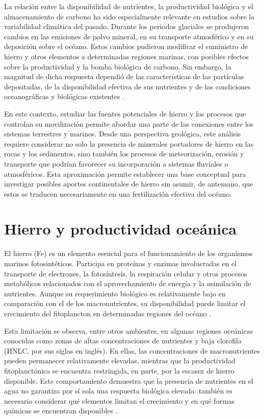 La relación entre la disponibilidad de nutrientes, la productividad biológica y el almacenamiento de carbono ha sido especialmente relevante en estudios sobre la variabilidad climática del pasado. Durante los periodos glaciales se produjeron cambios en las emisiones de polvo mineral, en su transporte atmosférico y en su deposición sobre el océano. Estos cambios pudieron modificar el suministro de hierro y otros elementos a determinadas regiones marinas, con posibles efectos sobre la productividad y la bomba biológica de carbono. Sin embargo, la magnitud de dicha respuesta dependió de las características de las partículas depositadas, de la disponibilidad efectiva de sus nutrientes y de las condiciones oceanográficas y biológicas existentes \citep{Lambert2021,Zan2025}.

En este contexto, estudiar las fuentes potenciales de hierro y los procesos que controlan su movilización permite abordar una parte de las conexiones entre los sistemas terrestres y marinos. Desde una perspectiva geológica, este análisis requiere considerar no solo la presencia de minerales portadores de hierro en las rocas y los sedimentos, sino también los procesos de meteorización, erosión y transporte que podrían favorecer su incorporación a sistemas fluviales o atmosféricos. Esta aproximación permite establecer una base conceptual para investigar posibles aportes continentales de hierro sin asumir, de antemano, que estos se traducen necesariamente en una fertilización efectiva del océano.

\section{Hierro y productividad oceánica}

El hierro (Fe) es un elemento esencial para el funcionamiento de los organismos marinos fotosintéticos. Participa en proteínas y enzimas involucradas en el transporte de electrones, la fotosíntesis, la respiración celular y otros procesos metabólicos relacionados con el aprovechamiento de energía y la asimilación de nutrientes. Aunque su requerimiento biológico es relativamente bajo en comparación con el de los macronutrientes, su disponibilidad puede limitar el crecimiento del fitoplancton en determinadas regiones del océano \citep{Tagliabue2017}.

Esta limitación se observa, entre otros ambientes, en algunas regiones oceánicas conocidas como zonas de altas concentraciones de nutrientes y baja clorofila (HNLC, por sus siglas en inglés). En ellas, las concentraciones de macronutrientes pueden permanecer relativamente elevadas, mientras que la productividad fitoplanctónica se encuentra restringida, en parte, por la escasez de hierro disponible. Este comportamiento demuestra que la presencia de nutrientes en el agua no garantiza por sí sola una respuesta biológica elevada: también es necesario considerar qué elementos limitan el crecimiento y en qué formas químicas se encuentran disponibles \citep{Tagliabue2017}.


